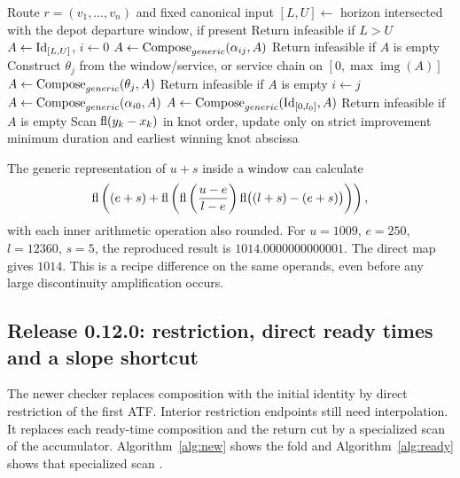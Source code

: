 \begin{algorithm}[htbp]
\caption{Route evaluation in 0.11.0 (\contractone)}\label{alg:old}
\begin{algorithmic}[1]
\Require Route $r=(v_1,\dots,v_n)$ and fixed canonical input
\State $[L,U]\gets$ horizon intersected with the depot departure window, if present
\State Return infeasible if $L>U$
\State $A\gets\operatorname{Id}_{[L,U]}$, $i\gets0$
  \State $A\gets\operatorname{Compose}_{generic}(\alpha_{ij},A)$
  \State Return infeasible if $A$ is empty
  \State Construct $\theta_j$ from the window/service, or service chain on $[0,\max\operatorname{img}(A)]$
  \State $A\gets\operatorname{Compose}_{generic}(\theta_j,A)$
  \State Return infeasible if $A$ is empty
  \State $i\gets j$
\EndFor
\State $A\gets\operatorname{Compose}_{generic}(\alpha_{i0},A)$
  \State $A\gets\operatorname{Compose}_{generic}(\operatorname{Id}_{[0,l_0]},A)$
\EndIf
\State Return infeasible if $A$ is empty
\State Scan $\operatorname{fl}(y_k-x_k)$ in knot order, update only on strict improvement
\State \Return minimum duration and earliest winning knot abscissa
\end{algorithmic}
\end{algorithm}

The generic representation of $u+s$ inside a window can calculate
\begin{equation}\label{eq:theta}
 \operatorname{fl}\left((e+s)+\operatorname{fl}\left(\operatorname{fl}\left(\frac{u-e}{l-e}\right)\operatorname{fl}\bigl((l+s)-(e+s)\bigr)\right)\right),
\end{equation}
with each inner arithmetic operation also rounded. For $u=1009$, $e=250$, $l=12360$, $s=5$, the reproduced result is $1014.0000000000001$. The direct map gives $1014$. This is a recipe difference on the same operands, even before any large discontinuity amplification occurs.

\subsection{Release 0.12.0: restriction, direct ready times and a slope shortcut}

The newer checker replaces composition with the initial identity by direct restriction of the first ATF. Interior restriction endpoints still need interpolation. It replaces each ready-time composition and the return cut by a specialized scan of the accumulator. Algorithm~\ref{alg:new} shows the fold and Algorithm~\ref{alg:ready} shows that specialized scan \autocite{mamutChecker0122026}.

